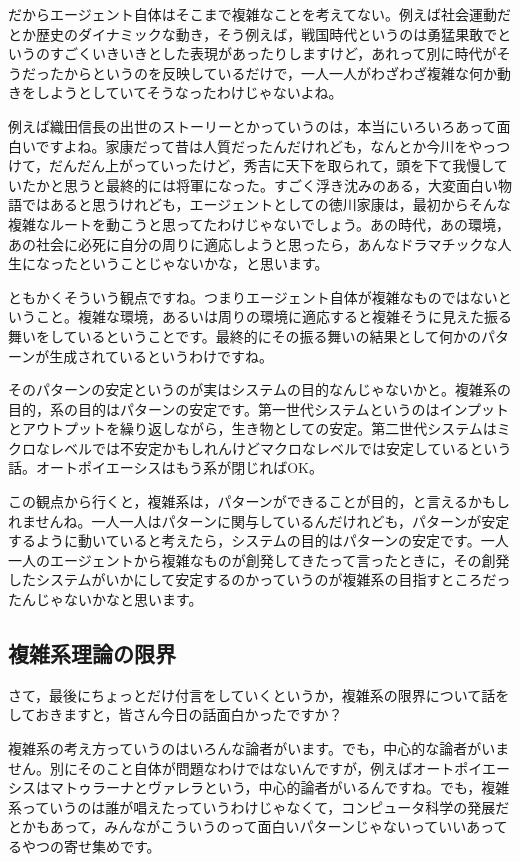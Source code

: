 \documentclass{ltjsbook}
\begin{document}
だからエージェント自体はそこまで複雑なことを考えてない。例えば社会運動だとか歴史のダイナミックな動き，そう例えば，戦国時代というのは勇猛果敢でというのすごくいきいきとした表現があったりしますけど，あれって別に時代がそうだったからというのを反映しているだけで，一人一人がわざわざ複雑な何か動きをしようとしていてそうなったわけじゃないよね。

例えば織田信長の出世のストーリーとかっていうのは，本当にいろいろあって面白いですよね。家康だって昔は人質だったんだけれども，なんとか今川をやっつけて，だんだん上がっていったけど，秀吉に天下を取られて，頭を下て我慢していたかと思うと最終的には将軍になった。すごく浮き沈みのある，大変面白い物語ではあると思うけれども，エージェントとしての徳川家康は，最初からそんな複雑なルートを動こうと思ってたわけじゃないでしょう。あの時代，あの環境，あの社会に必死に自分の周りに適応しようと思ったら，あんなドラマチックな人生になったということじゃないかな，と思います。

ともかくそういう観点ですね。つまりエージェント自体が複雑なものではないということ。複雑な環境，あるいは周りの環境に適応すると複雑そうに見えた振る舞いをしているということです。最終的にその振る舞いの結果として何かのパターンが生成されているというわけですね。

そのパターンの安定というのが実はシステムの目的なんじゃないかと。複雑系の目的，系の目的はパターンの安定です。第一世代システムというのはインプットとアウトプットを繰り返しながら，生き物としての安定。第二世代システムはミクロなレベルでは不安定かもしれんけどマクロなレベルでは安定しているという話。オートポイエーシスはもう系が閉じればOK。

この観点から行くと，複雑系は，パターンができることが目的，と言えるかもしれませんね。一人一人はパターンに関与しているんだけれども，パターンが安定するように動いていると考えたら，システムの目的はパターンの安定です。一人一人のエージェントから複雑なものが創発してきたって言ったときに，その創発したシステムがいかにして安定するのかっていうのが複雑系の目指すところだったんじゃないかなと思います。

\subsection{複雑系理論の限界}
さて，最後にちょっとだけ付言をしていくというか，複雑系の限界について話をしておきますと，皆さん今日の話面白かったですか？

複雑系の考え方っていうのはいろんな論者がいます。でも，中心的な論者がいません。別にそのこと自体が問題なわけではないんですが，例えばオートポイエーシスはマトゥラーナとヴァレラという，中心的論者がいるんですね。でも，複雑系っていうのは誰が唱えたっていうわけじゃなくて，コンピュータ科学の発展だとかもあって，みんながこういうのって面白いパターンじゃないっていいあってるやつの寄せ集めです。
\end{document}
